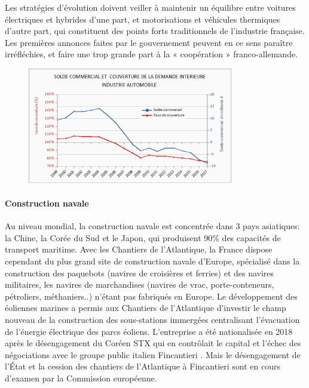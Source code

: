\documentclass[a4paper]{article}
\begin{document}
Les stratégies d’évolution doivent veiller à maintenir un équilibre entre voitures électriques et hybrides d’une part, et motorisations et véhicules thermiques d’autre part, qui constituent des points forts traditionnels de l’industrie française. Les premières annonces faites par le gouvernement peuvent en ce sens paraître irréfléchies, et faire une trop grande part à la « coopération » franco-allemande. 

\begin{figure}[H]
    \centering
    \includegraphics*[width=0.8\textwidth]{images/auto}
    \label{fig:auto}
\end{figure}

\paragraph{Construction navale}
Au niveau mondial, la construction navale est concentrée dans 3 pays asiatiques: la Chine, la Corée du Sud et le Japon, qui produisent 90\% des capacités de transport maritime. Avec les Chantiers de l’Atlantique, la France dispose cependant du plus grand site de construction navale d’Europe, spécialisé dans la construction des paquebots (navires de croisières et ferries) et des navires militaires, les navires de marchandises (navires de vrac, porte-conteneurs, pétroliers, méthaniers..) n’étant pas fabriqués en Europe. Le développement des éoliennes marines a permis aux Chantiers de l’Atlantique d’investir le champ nouveau de la construction des sous-stations immergées centralisant l’évacuation de l’énergie électrique des parcs éoliens. L’entreprise a été nationalisée en 2018 après le désengagement du Coréen STX qui en contrôlait le capital et l’échec des négociations avec le groupe public italien Fincantieri . Mais le désengagement de l’État et la cession des chantiers de l’Atlantique à Fincantieri sont en cours d’examen par la Commission européenne.
\end{document}

